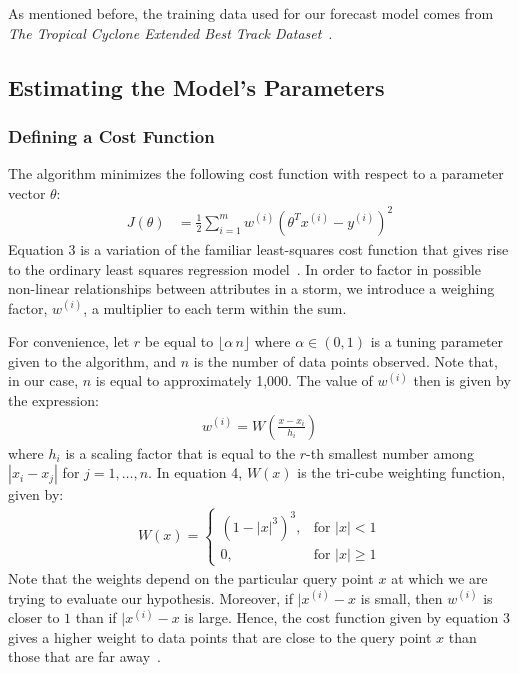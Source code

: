 \documentclass[letterpaper,twocolumn,10pt]{article}
\begin{document}
As mentioned before, the training data used for
our forecast model comes from \emph{The Tropical Cyclone Extended Best Track
Dataset}~\cite{BestTrackDataset}.


\subsection{Estimating the Model's Parameters}
\subsubsection{Defining a Cost Function}
The algorithm minimizes the following cost function with respect to a parameter
vector $\theta$:
\begin{align}
  J(\theta) &= \frac{1}{2}\sum_{i=1}^{m}{
                w^{(i)}\left(\theta^T x^{(i)} - y^{(i)}\right)^2
              }
\end{align}
Equation $3$ is a variation of the familiar least-squares cost function that
gives rise to the ordinary least squares regression
model~\cite{LinearRegression}. In order to factor in possible non-linear
relationships between attributes in a storm, we introduce a weighing factor,
$w^{(i)}$, a multiplier to each term within the sum.

For convenience, let $r$ be equal to $\lfloor \alpha\,n \rfloor$ where
\mbox{$\alpha\in(0,1)$} is a tuning parameter given to the algorithm, and $n$
is the number of data points observed. Note that, in our case, $n$ is equal to
approximately 1,000. The value of $w^{(i)}$ then is given by the expression:
\begin{align}
  w^{(i)} = W\left(\frac{x - x_i}{h_i}\right)
\end{align}
where $h_i$ is a scaling factor that is equal to the \mbox{$r$-th} smallest
number among $|x_i - x_j|$ for $j = 1,\ldots,n$. In equation 4, $W(x)$ is the 
tri-cube weighting function, given by:
\begin{align}
  W(x) =
  \begin{cases}
    (1 - |x|^3)^3, & \text{for $|x| < 1$}\\
    0, & \text{for $|x| \ge 1$}
  \end{cases}
\end{align}
Note that the weights depend on the particular query point $x$ at which we
are trying to evaluate our hypothesis. Moreover, if $|x^{(i)} - x$ is small,
then $w^{(i)}$ is closer to $1$ than if $|x^{(i)} - x$ is large. Hence, the cost
function given by equation 3 gives a higher weight to data points that are close
to the query point $x$ than those that are far away~\cite{LinearRegression}.
\end{document}
